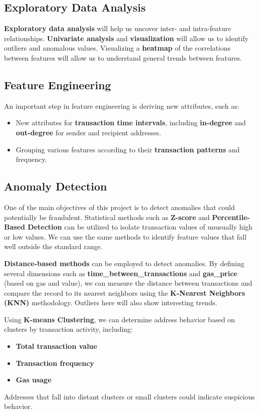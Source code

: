 \documentclass[sigconf]{acmart}
\begin{document}
\subsection{Exploratory Data Analysis}
\textbf{Exploratory data analysis} will help us uncover inter- and intra-feature relationships. \textbf{Univariate analysis} and \textbf{visualization} will allow us to identify outliers and anomalous values. Visualizing a \textbf{heatmap} of the correlations between features will allow us to understand general trends between features.

\subsection{Feature Engineering}
An important step in feature engineering is deriving new attributes, such as:
\begin{itemize}
    \item New attributes for \textbf{transaction time intervals}, including \textbf{in-degree} and \textbf{out-degree} for sender and recipient addresses.
    \item Grouping various features according to their \textbf{transaction patterns} and frequency.
\end{itemize}

\subsection{Anomaly Detection}
One of the main objectives of this project is to detect anomalies that could potentially be fraudulent. Statistical methods such as \textbf{Z-score} and \textbf{Percentile-Based Detection} can be utilized to isolate transaction values of unusually high or low values. We can use the same methods to identify feature values that fall well outside the standard range.

\textbf{Distance-based methods} can be employed to detect anomalies. By defining several dimensions such as \textbf{time\_between\_transactions} and \textbf{gas\_price} (based on gas and value), we can measure the distance between transactions and compare the record to its nearest neighbors using the \textbf{K-Nearest Neighbors (KNN)} methodology. Outliers here will also show interesting trends. 

Using \textbf{K-means Clustering}, we can determine address behavior based on clusters by transaction activity, including:
\begin{itemize}
    \item \textbf{Total transaction value}
    \item \textbf{Transaction frequency}
    \item \textbf{Gas usage}
\end{itemize}
Addresses that fall into distant clusters or small clusters could indicate suspicious behavior.
\end{document}
